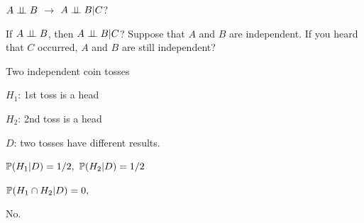 \documentclass[fleqn,aspectratio=169]{beamer}
\begin{document}
\begin{frame}{ $A \perp \!\!\! \perp B$ $\rightarrow$  $A \perp \!\!\! \perp B | C$?}

\plitemsep 0.2in
\bci 

\item If $A \perp \!\!\! \perp B$,  then $A \perp \!\!\! \perp B | C$?
Suppose that $A$ and $B$ are independent. If you heard that $C$ occurred,  $A$ and $B$ are still independent? \hfill {}

\item<2-> Two independent coin tosses

\plitemsep 0.05in
\bci
\item $H_1$: 1st toss is a head
\item $H_2$: 2nd toss is a head
\item $D$: two tosses have different results.
\eci

\item<3-> $\mathbb{P}( H_1 | D ) = 1/2,$ $\mathbb{P}( H_2 | D ) = 1/2$  


\item<4-> $\mathbb{P}( H_1 \cap H_2 | D ) = 0,$  

\item<5-> No.
\eci 
\end{frame}
\end{document}
